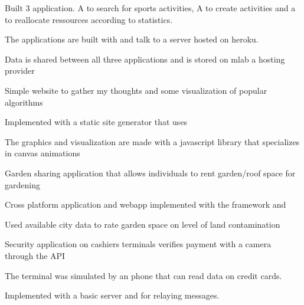 \documentclass[]{deedy-resume-openfont}
\begin{document}
\begin{minipage}[t]{0.66\textwidth}
\begin{tightemize}
\item Built 3 application. A  to search for sports activities, A  to create activities and a  to reallocate ressources according to statistics.
\item The applications are built with  and talk to a  server hosted on heroku.
\item Data is shared between all three applications and is stored on mlab a  hosting provider
\end{tightemize}
\sectionsep

\begin{tightemize}
\item Simple website to gather my thoughts and some visualization of popular algorithms
\item Implemented with  a static site generator that uses 
\item The graphics and visualization are made with  a javascript library that specializes in canvas animations
\end{tightemize}
\sectionsep

\begin{tightemize}
\item Garden sharing application that allows individuals to rent garden/roof space for gardening
\item Cross platform application and webapp implemented with the  framework and 
\item Used available city data to rate garden space on level of land contamination
\end{tightemize}
\sectionsep

\begin{tightemize}
\item Security application on cashiers terminals verifies payment with a camera through the  API
\item The terminal was simulated by an  phone that can read  data on credit cards.
\item Implemented with a basic  server and  for relaying messages.
\end{tightemize}
\sectionsep

\end{minipage} 
\end{document}

